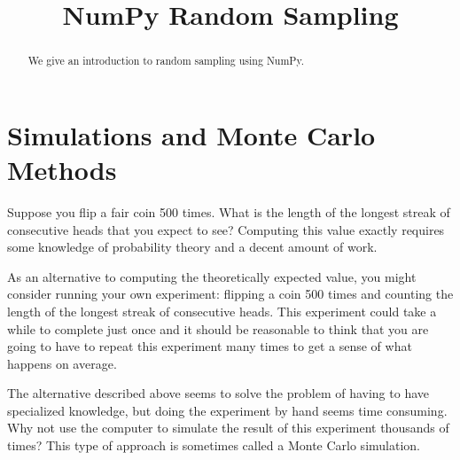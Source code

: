 \documentclass{ximera}
\title{NumPy Random Sampling}
\begin{document}
  
\begin{abstract}  
We give an introduction to random sampling using NumPy.
\end{abstract}  
\maketitle

\section{Simulations and Monte Carlo Methods}

Suppose you flip a fair coin 500 times. What is the length of the longest streak of consecutive heads that you expect to see? Computing this value exactly requires some knowledge of probability theory and a decent amount of work. 

As an alternative to computing the theoretically expected value, you might consider running your own experiment: flipping a coin 500 times and counting the length of the longest streak of consecutive heads. This experiment could take a while to complete just once and it should be reasonable to think that you are going to have to repeat this experiment many times to get a sense of what happens on average.

The alternative described above seems to solve the problem of having to have specialized knowledge, but doing the experiment by hand seems time consuming. Why not use the computer to simulate the result of this experiment thousands of times? This type of approach is sometimes called a Monte Carlo simulation.
\end{document}
